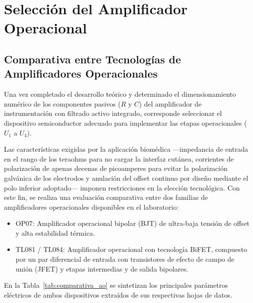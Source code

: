 \chapter{Selección del Amplificador Operacional}
\label{sec:seleccion_ao}

\section{Comparativa entre Tecnologías de Amplificadores Operacionales}

Una vez completado el desarrollo teórico y determinado el dimensionamiento numérico de los componentes pasivos ($R$ y $C$) del amplificador de instrumentación con filtrado activo integrado, corresponde seleccionar el dispositivo semiconductor adecuado para implementar las etapas operacionales ($U_1$ a $U_4$).

Las características exigidas por la aplicación biomédica —impedancia de entrada en el rango de los teraohms para no cargar la interfaz cutánea, corrientes de polarización de apenas decenas de picoamperes para evitar la polarización galvánica de los electrodos y anulación del offset continuo por diseño mediante el polo inferior adoptado— imponen restricciones en la elección tecnológica. Con este fin, se realiza una evaluación comparativa entre dos familias de amplificadores operacionales disponibles en el laboratorio:
\begin{itemize}
  \item OP07: Amplificador operacional bipolar (BJT) de ultra-baja tensión de offset y alta estabilidad térmica.
  \item TL081 / TL084: Amplificador operacional con tecnología BiFET, compuesto por un par diferencial de entrada
  con transistores de efecto de campo de unión (JFET) y etapas intermedias y de salida bipolares.
\end{itemize}

En la Tabla~\ref{tab:comparativa_ao} se sintetizan los principales parámetros eléctricos de ambos dispositivos
extraídos de sus respectivas hojas de datos.

